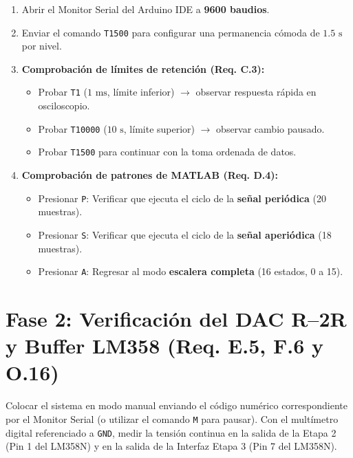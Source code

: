 \documentclass[10pt,a4paper]{article}
\begin{document}
\begin{enumerate}[leftmargin=*]
    \item Abrir el Monitor Serial del Arduino IDE a \textbf{9600 baudios}.
    \item Enviar el comando \texttt{T1500} para configurar una permanencia cómoda de $1.5\text{ s}$ por nivel.
    \item \textbf{Comprobación de límites de retención (Req. C.3):}
    \begin{itemize}
        \item Probar \texttt{T1} ($1\text{ ms}$, límite inferior) $\to$ observar respuesta rápida en osciloscopio.
        \item Probar \texttt{T10000} ($10\text{ s}$, límite superior) $\to$ observar cambio pausado.
        \item Probar \texttt{T1500} para continuar con la toma ordenada de datos.
    \end{itemize}
    \item \textbf{Comprobación de patrones de MATLAB (Req. D.4):}
    \begin{itemize}
        \item Presionar \texttt{P}: Verificar que ejecuta el ciclo de la \textbf{señal periódica} (20 muestras).
        \item Presionar \texttt{S}: Verificar que ejecuta el ciclo de la \textbf{señal aperiódica} (18 muestras).
        \item Presionar \texttt{A}: Regresar al modo \textbf{escalera completa} (16 estados, 0 a 15).
    \end{itemize}
\end{enumerate}

\section{Fase 2: Verificación del DAC R--2R y Buffer LM358 (Req. E.5, F.6 y O.16)}

Colocar el sistema en modo manual enviando el código numérico correspondiente por el Monitor Serial (o utilizar el comando \texttt{M} para pausar). Con el multímetro digital referenciado a \texttt{GND}, medir la tensión continua en la salida de la Etapa 2 (Pin 1 del LM358N) y en la salida de la Interfaz Etapa 3 (Pin 7 del LM358N).
\end{document}
